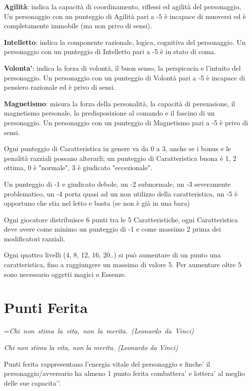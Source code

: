 \documentclass[a4paper,11pt,twoside,openany]{book}
\makeatletter
\newcommand{\mybox}[1]{%
	\setbox0=\hbox{#1}%
	\setlength{\@tempdima}{\dimexpr\wd0+13pt}%
	\begin{tcolorbox}[boxrule=0.5pt,arc=4pt, breakable,enhanced,
		left=6pt,right=6pt,top=6pt,bottom=6pt,boxsep=0pt,width=\@tempdima]
		#1
	\end{tcolorbox}
}
\makeatother
\begin{document}
\textbf{Agilità}: indica la capacità di coordinamento, riflessi ed agilità del personaggio, Un personaggio con un punteggio di Agilità pari a -5 è incapace di muoversi ed è completamente immobile (ma non privo di sensi).

\textbf{Intelletto}: indica la componente razionale, logica, cognitiva del personaggio. Un personaggio con un punteggio di Intelletto pari a -5 è in stato di coma.

\textbf{Volonta'}: indica la forza di volontà, il buon senso, la perspicacia e l'intuito del personaggio. Un personaggio con un punteggio di Volontà pari a -5 è incapace di pensiero razionale ed è privo di sensi.

\textbf{Magnetismo}: misura la forza della personalità, la capacità di persuasione, il magnetismo personale, la predisposizione al comando e il fascino di un personaggio. Un personaggio con un punteggio di Magnetismo pari a -5 è privo di sensi.

\smallskip

Ogni punteggio di Caratteristica in genere va da 0 a 3, anche se i bonus e le penalità razziali possano alterarli; un punteggio di Caratteristica buona è 1, 2 ottima, 0 è "normale", 3 è giudicato "eccezionale".

Un punteggio di -1 e giudicato debole, un -2 subnormale, un -3 severamente problematico, un -4 porta quasi ad un non utilizzo della caratteristica, un -5 è opportuno che stia nel letto e basta (se non è già in una bara)

Ogni giocatore distribuisce 6 punti tra le 5 Caratteristiche, ogni Caratteristica deve avere come minimo un punteggio di -1 e come massimo 2 prima dei modificatori razziali.

Ogni quattro livelli (4, 8, 12, 16, 20..) si può aumentare di un punto una caratteristica, fino a raggiungere un massimo di valore 5. Per aumentare oltre 5 sono necessario oggetti magici o Essenze.


\section{Punti Ferita}

\mybox{\textit{Chi non stima la vita, non la merita. (Leonardo da Vinci)
}}\medskip


Punti ferita rappresentano l’energia vitale del personaggio e finche’ il personaggio/avversario ha almeno 1 punto ferita combattera’ e lottera’ al meglio delle sue capacita'’.
\end{document}
